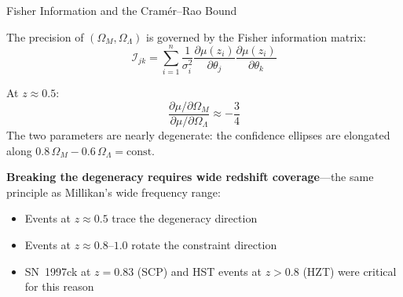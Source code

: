 \documentclass[aspectratio=169]{beamer}
\begin{document}
\begin{frame}{Fisher Information and the Cram\'er--Rao Bound}

The precision of $(\Omega_M,\Omega_\Lambda)$ is governed by the Fisher
information matrix:
\[
  \mathcal{I}_{jk} =
  \sum_{i=1}^n \frac{1}{\sigma_i^2}
  \frac{\partial\mu(z_i)}{\partial\theta_j}
  \frac{\partial\mu(z_i)}{\partial\theta_k}
\]

\medskip
At $z \approx 0.5$:
\[
  \frac{\partial\mu/\partial\Omega_M}{\partial\mu/\partial\Omega_\Lambda}
  \approx -\frac{3}{4}
\]
The two parameters are nearly degenerate: the confidence ellipses are
elongated along $0.8\,\Omega_M - 0.6\,\Omega_\Lambda = \text{const}$.

\medskip
\textbf{Breaking the degeneracy requires wide redshift coverage}---the
same principle as Millikan's wide frequency range:

\begin{itemize}
  \item Events at $z \approx 0.5$ trace the degeneracy direction
  \item Events at $z \approx 0.8$--$1.0$ rotate the constraint direction
  \item SN~1997ck at $z = 0.83$ (SCP) and HST events at $z > 0.8$
    (HZT) were critical for this reason
\end{itemize}

\end{frame}
\end{document}
